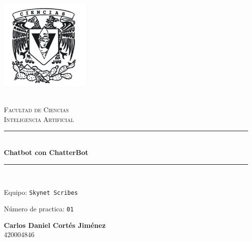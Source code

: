 \begin{titlepage}
\center 
\newcommand{\HRule}{\rule{\linewidth}{0.5mm}} 

\includegraphics[width=4.5cm]{IMA/cienciasWhite.png}

\quad \\[0.2cm]
\textsc{\huge Facultad de Ciencias}\\[.6cm] 
\textsc{\huge Inteligencia Artificial}\\[0.5cm]

\makeatletter
    \HRule \\ [0.4cm]
        { \huge \bfseries Chatbot con ChatterBot}\\
    \HRule \\ [0.4cm]
    
\vspace{2mm}

\begin{flushleft}
    \Large{Equipo:} \texttt{\Large Skynet Scribes}
\end{flushleft}
\begin{flushleft}
    \Large{Número de practica:} \texttt{\Large 01}\\[0.8cm]
\end{flushleft}


\begin{minipage}{0.8\textwidth}
    \begin{flushright}
        \textbf{\large{Carlos Daniel Cortés Jiménez}}\\    
        420004846        
    \end{flushright}
\end{minipage}

\vspace{5mm}


\end{titlepage}
